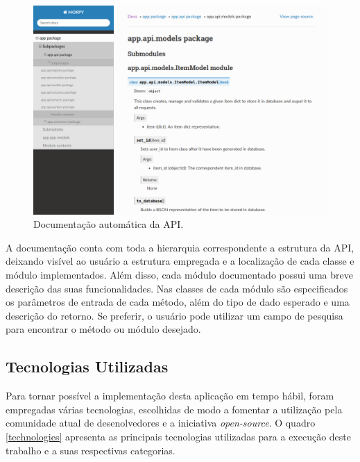 \begin{figure}[h!tp]
	\caption{\label{docs}Documentação automática da API.}
	\begin{center}
		\includegraphics[scale=0.55]{images/docs.png}
	\end{center}
	\hspace{5.5cm}{Fonte: O Autor.}
\end{figure}

A documentação conta com toda a hierarquia correspondente a estrutura da API, deixando visível ao usuário a estrutura empregada e a localização de cada classe e módulo implementados. Além disso, cada módulo documentado possui uma breve descrição das suas funcionalidades. Nas classes de cada módulo são especificados os parâmetros de entrada de cada método, além do tipo de dado esperado e uma descrição do retorno. Se preferir, o usuário pode utilizar um campo de pesquisa para encontrar o método ou módulo desejado.

\subsection{Tecnologias Utilizadas} \label{tecnologias}

Para tornar possível a implementação desta aplicação em tempo hábil, foram empregadas várias tecnologias, escolhidas de modo a fomentar a utilização pela comunidade atual de desenolvedores e a iniciativa \textit{open-source}. O quadro \ref{technologies} apresenta as principais tecnologias utilizadas para a execução deste trabalho e a suas respectivas categorias.

